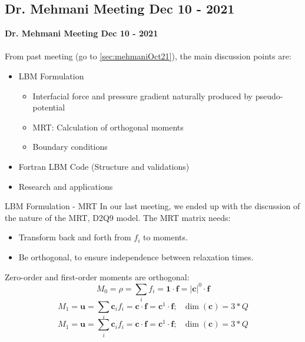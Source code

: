 \documentclass{beamer}
\begin{document}
	
	\subsection{Dr. Mehmani Meeting Dec 10 - 2021}
	\label{sec:mehmaniDec21}
	\justifying
	\begin{frame}
		\textbf{Dr. Mehmani Meeting Dec 10 - 2021}\\~\\
		From past meeting (go to \ref{sec:mehmaniOct21}), the main discussion points are:
		\begin{itemize}
			\item LBM Formulation
			\begin{itemize}
				\item Interfacial force and pressure gradient naturally produced by pseudo-potential
				\item MRT: Calculation of orthogonal moments
				\item Boundary conditions
			\end{itemize}
			\item Fortran LBM Code (Structure and validations)
			\item Research and applications
		\end{itemize}
	\end{frame}

	
	\begin{frame}{LBM Formulation - MRT}
		In our last meeting, we ended up with the discussion of the nature of the MRT, D2Q9 model. The MRT matrix needs:
		\begin{itemize}
			\item Transform back and forth from $f_i$ to moments.
			\item Be orthogonal, to ensure independence between relaxation times.
		\end{itemize}
		Zero-order and first-order moments are orthogonal:
		\begin{equation*}
			M_0 = \rho = \sum_i f_i = \mathbf{1} \cdot \mathbf{f} = |\mathbf{c}|^{0} \cdot \mathbf{f}
		\end{equation*}
		\begin{equation*}
		 M_1 =\mathbf{u} = \sum_i \mathbf{c}_i f_i  = \mathbf{c} \cdot \mathbf{f} =  \mathbf{c}^1 \cdot \mathbf{f}; \, \, \, \, \dim(\mathbf{c}) = 3*Q
		\end{equation*}
		\begin{equation*}
		M_1 =\mathbf{u} = \sum_i \mathbf{c}_i f_i  = \mathbf{c} \cdot \mathbf{f} =  \mathbf{c}^1 \cdot \mathbf{f}; \, \, \, \, \dim(\mathbf{c}) = 3*Q
		\end{equation*}
	\end{frame}
	
\end{document}
